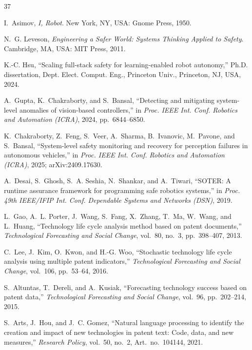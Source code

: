 \documentclass[letterpaper,9pt,conference]{ieeeconf}
\begin{document}
\scriptsize\linespread{0.62}\selectfont
\setlength{\itemsep}{-2.2pt}\setlength{\parsep}{0pt}
\begin{thebibliography}{37}

I.~Asimov, \textit{I, Robot}. New York, NY, USA: Gnome Press, 1950.

N.~G. Leveson, \textit{Engineering a Safer World: Systems Thinking Applied to Safety}. Cambridge, MA, USA: MIT Press, 2011.

K.-C. Hsu, ``Scaling full-stack safety for learning-enabled robot autonomy,'' Ph.D. dissertation, Dept. Elect. Comput. Eng., Princeton Univ., Princeton, NJ, USA, 2024.

A.~Gupta, K.~Chakraborty, and S.~Bansal, ``Detecting and mitigating system-level anomalies of vision-based controllers,'' in \textit{Proc. IEEE Int. Conf. Robotics and Automation (ICRA)}, 2024, pp.~6844--6850.

K.~Chakraborty, Z.~Feng, S.~Veer, A.~Sharma, B.~Ivanovic, M.~Pavone, and S.~Bansal, ``System-level safety monitoring and recovery for perception failures in autonomous vehicles,'' in \textit{Proc. IEEE Int. Conf. Robotics and Automation (ICRA)}, 2025; arXiv:2409.17630.

A.~Desai, S.~Ghosh, S.~A. Seshia, N.~Shankar, and A.~Tiwari, ``SOTER: A runtime assurance framework for programming safe robotics systems,'' in \textit{Proc. 49th IEEE/IFIP Int. Conf. Dependable Systems and Networks (DSN)}, 2019.

L.~Gao, A.~L. Porter, J.~Wang, S.~Fang, X.~Zhang, T.~Ma, W.~Wang, and L.~Huang, ``Technology life cycle analysis method based on patent documents,'' \textit{Technological Forecasting and Social Change}, vol.~80, no.~3, pp.~398--407, 2013.

C.~Lee, J.~Kim, O.~Kwon, and H.-G. Woo, ``Stochastic technology life cycle analysis using multiple patent indicators,'' \textit{Technological Forecasting and Social Change}, vol.~106, pp.~53--64, 2016.

S.~Altuntas, T.~Dereli, and A.~Kusiak, ``Forecasting technology success based on patent data,'' \textit{Technological Forecasting and Social Change}, vol.~96, pp.~202--214, 2015.

S.~Arts, J.~Hou, and J.~C. Gomez, ``Natural language processing to identify the creation and impact of new technologies in patent text: Code, data, and new measures,'' \textit{Research Policy}, vol.~50, no.~2, Art.~no.~104144, 2021.


\end{thebibliography}
\end{document}
